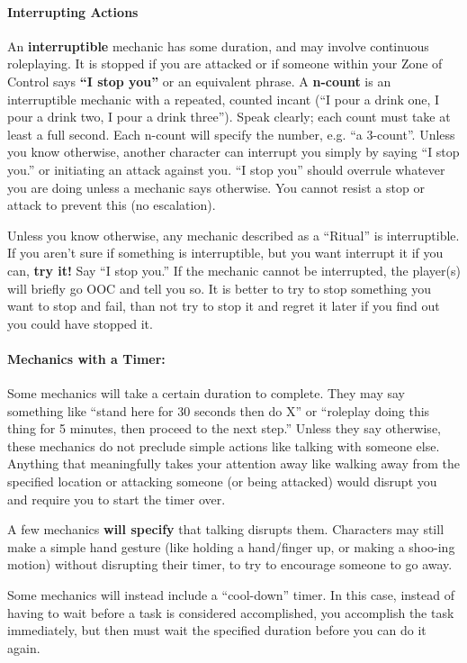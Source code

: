 \documentclass[sheet]{GL2020}
\begin{document}
\paragraph{Interrupting Actions}An {\bf interruptible} mechanic has some duration, and may involve continuous roleplaying. It is stopped if you are attacked or if someone within your Zone of Control says {\bf ``I stop you''} or an equivalent phrase. A {\bf n-count} is an interruptible mechanic with a repeated, counted incant (``I pour a drink one, I pour a drink two, I pour a drink three''). Speak clearly; each count must take at least a full second. Each n-count will specify the number, e.g. ``a 3-count''. Unless you know otherwise, another character can interrupt you simply by saying ``I stop you.'' or initiating an attack against you. ``I stop you'' should overrule whatever you are doing unless a mechanic says otherwise. You cannot resist a stop or attack to prevent this (no escalation).

Unless you know otherwise, any mechanic described as a ``Ritual'' is interruptible. If you aren't sure if something is interruptible, but you want interrupt it if you can, \textbf{try it!} Say ``I stop you.'' If the mechanic cannot be interrupted, the player(s) will briefly go OOC and tell you so. It is better to try to stop something you want to stop and fail, than not try to stop it and regret it later if you find out you could have stopped it.

\paragraph{Mechanics with a Timer:} Some mechanics will take a certain duration to complete. They may say something like ``stand here for 30 seconds then do X'' or ``roleplay doing this thing for 5 minutes, then proceed to the next step.'' Unless they say otherwise, these mechanics do not preclude simple actions like talking with someone else. Anything that meaningfully takes your attention away like walking away from the specified location or attacking someone (or being attacked) would disrupt you and require you to start the timer over.

A few mechanics \textbf{will specify} that talking disrupts them. Characters may still make a simple hand gesture (like holding a hand/finger up, or making a shoo-ing motion) without disrupting their timer, to try to encourage someone to go away.

Some mechanics will instead include a ``cool-down'' timer. In this case, instead of having to wait before a task is considered accomplished, you accomplish the task immediately, but then must wait the specified duration before you can do it again. 
\end{document}
